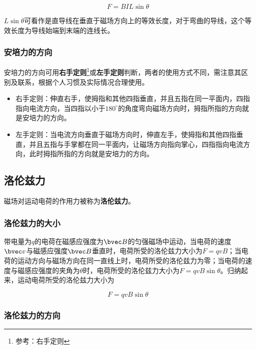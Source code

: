 \begin{equation}
F=BIL\sin\theta
\end{equation}

$ L\sin\theta$可看作是直导线在垂直于磁场方向上的等效长度，对于弯曲的导线，这个等效长度为导线始端到末端的连线长。

\subsubsection{安培力的方向}

安培力的方向可用\textbf{右手定则}\footnote{参考：右手定则}或\textbf{左手定则}判断，两者的使用方式不同，需注意其区别及联系，根据个人习惯及实际情况合理使用。

\begin{itemize}
\item 右手定则：伸直右手，使拇指和其他四指垂直，并且五指在同一平面内，四指指向电流方向，当四指以小于$180^\circ$的角度弯向磁场方向时，拇指所指的方向就是安培力的方向。
\item 左手定则：当电流方向垂直于磁场方向时，伸直左手，使拇指和其他四指垂直，并且五指与手掌都在同一平面内，让磁场方向指向掌心，四指指向电流方向，此时拇指所指的方向就是安培力的方向。
\end{itemize}

\subsection{洛伦兹力}

磁场对运动电荷的作用力被称为\textbf{洛伦兹力}。

\subsubsection{洛伦兹力的大小}

带电量为$q$的电荷在磁感应强度为$\bvec B$的匀强磁场中运动，当电荷的速度$\bvec v$与磁感应强度$\bvec B$垂直时，电荷所受的洛伦兹力大小为$F=qvB$；当电荷的运动方向与磁场方向在同一直线上时，电荷所受的洛伦兹力为零；当电荷的速度与磁感应强度的夹角为$\theta$时，电荷所受的洛伦兹力大小为$F=qvB\sin\theta$。归纳起来，运动电荷所受的洛伦兹力大小为

\begin{equation}
F=qvB\sin\theta
\end{equation}

\subsubsection{洛伦兹力的方向}


